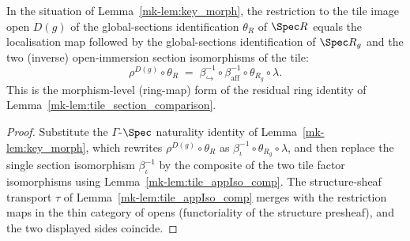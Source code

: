 \begin{lemma}\label{mk-lem:tile_section_ring_identity}
  \leanok

  In the situation of Lemma~\ref{mk-lem:key_morph}, the restriction to the tile image open \(D(g)\) of the
  global-sections identification \(\theta_R\) of \(\Spec R\) equals the localisation map followed by the
  global-sections identification of \(\Spec R_g\) and the two (inverse) open-immersion section
  isomorphisms of the tile:
  \[
    \rho^{D(g)} \circ \theta_R
    \;=\;
    \beta_{\hookrightarrow}^{-1} \circ \beta_{\mathrm{aff}}^{-1} \circ \theta_{R_g} \circ \lambda.
  \]
  This is the morphism-level (ring-map) form of the residual ring identity of
  Lemma~\ref{mk-lem:tile_section_comparison}.
\end{lemma}
\begin{proof}
  \leanok
  Substitute the \(\Gamma\)-\(\Spec\) naturality identity of Lemma~\ref{mk-lem:key_morph}, which rewrites
  \(\rho^{D(g)} \circ \theta_R\) as \(\beta_\iota^{-1} \circ \theta_{R_g} \circ \lambda\), and then
  replace the single section isomorphism \(\beta_\iota^{-1}\) by the composite of the two tile factor
  isomorphisms using Lemma~\ref{mk-lem:tile_appIso_comp}. The structure-sheaf transport \(\tau\) of
  Lemma~\ref{mk-lem:tile_appIso_comp} merges with the restriction maps in the thin category of opens
  (functoriality of the structure presheaf), and the two displayed sides coincide.
\end{proof}

